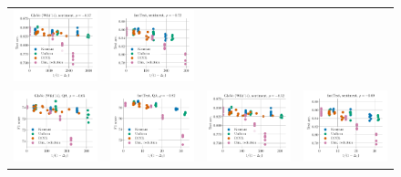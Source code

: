 \begin{figure}
\begin{tabular}{@{\hskip -0.0in}c@{\hskip -0.0in}c@{\hskip -0.0in}c@{\hskip -0.0in}c@{\hskip -0.0in}}
		\includegraphics[width=.245\linewidth]{figures/glove400k_sentiment_sst_test-acc_vs_gram-large-dim-delta1-1-trans_linx_stoc.pdf} &
		\includegraphics[width=.245\linewidth]{figures/fasttext1m_sentiment_sst_test-acc_vs_gram-large-dim-delta1-1-trans_linx_stoc.pdf} \\[-1em]
		\includegraphics[width=.245\linewidth]{figures/glove400k_qa_best-f1_vs_gram-large-dim-delta1-2-trans_linx_stoc.pdf} &
		\includegraphics[width=.245\linewidth]{figures/fasttext1m_qa_best-f1_vs_gram-large-dim-delta1-2-trans_linx_stoc.pdf} &
		\includegraphics[width=.245\linewidth]{figures/glove400k_sentiment_sst_test-acc_vs_gram-large-dim-delta1-2-trans_linx_stoc.pdf} &
		\includegraphics[width=.245\linewidth]{figures/fasttext1m_sentiment_sst_test-acc_vs_gram-large-dim-delta1-2-trans_linx_stoc.pdf} \\[-1em]

\end{tabular}
\end{figure}
